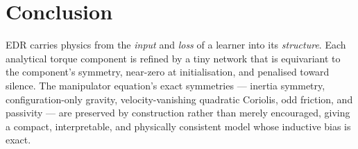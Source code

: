 \documentclass[11pt]{article}
\theoremstyle{definition}
\theoremstyle{plain}
\begin{document}
\section{Conclusion}
EDR carries physics from the \emph{input} and \emph{loss} of a learner into its
\emph{structure}. Each analytical torque component is refined by a tiny network
that is equivariant to the component's symmetry, near-zero at initialisation, and
penalised toward silence. The manipulator equation's exact symmetries --- inertia
symmetry, configuration-only gravity, velocity-vanishing quadratic Coriolis, odd
friction, and passivity --- are preserved by construction rather than merely
encouraged, giving a compact, interpretable, and physically consistent model whose
inductive bias is exact.
\end{document}
